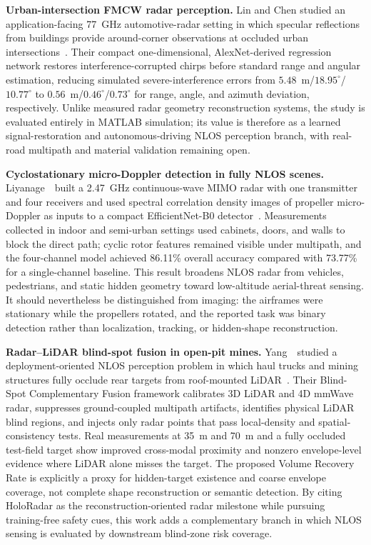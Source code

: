 \vspace{0.8mm}
\noindent \textbf{Urban-intersection FMCW radar perception.}
Lin and Chen studied an application-facing 77~GHz automotive-radar setting in which specular reflections from buildings provide around-corner observations at occluded urban intersections~\cite{linDeepLearningFMCWRadar2026}. Their compact one-dimensional, AlexNet-derived regression network restores interference-corrupted chirps before standard range and angular estimation, reducing simulated severe-interference errors from $5.48$~m/$18.95^{\circ}$/$10.77^{\circ}$ to $0.56$~m/$0.46^{\circ}$/$0.73^{\circ}$ for range, angle, and azimuth deviation, respectively. Unlike measured radar geometry reconstruction systems, the study is evaluated entirely in MATLAB simulation; its value is therefore as a learned signal-restoration and autonomous-driving NLOS perception branch, with real-road multipath and material validation remaining open.

\vspace{0.8mm}
\noindent \textbf{Cyclostationary micro-Doppler detection in fully NLOS scenes.}
Liyanage~\etal~built a 2.47~GHz continuous-wave MIMO radar with one transmitter and four receivers and used spectral correlation density images of propeller micro-Doppler as inputs to a compact EfficientNet-B0 detector~\cite{liyanageSUASNLOSRadar2026}. Measurements collected in indoor and semi-urban settings used cabinets, doors, and walls to block the direct path; cyclic rotor features remained visible under multipath, and the four-channel model achieved 86.11\% overall accuracy compared with 73.77\% for a single-channel baseline. This result broadens NLOS radar from vehicles, pedestrians, and static hidden geometry toward low-altitude aerial-threat sensing. It should nevertheless be distinguished from imaging: the airframes were stationary while the propellers rotated, and the reported task was binary detection rather than localization, tracking, or hidden-shape reconstruction.


\vspace{0.8mm}
\noindent \textbf{Radar--LiDAR blind-spot fusion in open-pit mines.}
Yang~\etal~studied a deployment-oriented NLOS perception problem in which haul trucks and mining structures fully occlude rear targets from roof-mounted LiDAR~\cite{yangMiningRadarLiDARNLOS2026}. Their Blind-Spot Complementary Fusion framework calibrates 3D LiDAR and 4D mmWave radar, suppresses ground-coupled multipath artifacts, identifies physical LiDAR blind regions, and injects only radar points that pass local-density and spatial-consistency tests. Real measurements at 35~m and 70~m and a fully occluded test-field target show improved cross-modal proximity and nonzero envelope-level evidence where LiDAR alone misses the target. The proposed Volume Recovery Rate is explicitly a proxy for hidden-target existence and coarse envelope coverage, not complete shape reconstruction or semantic detection. By citing HoloRadar as the reconstruction-oriented radar milestone while pursuing training-free safety cues, this work adds a complementary branch in which NLOS sensing is evaluated by downstream blind-zone risk coverage.

